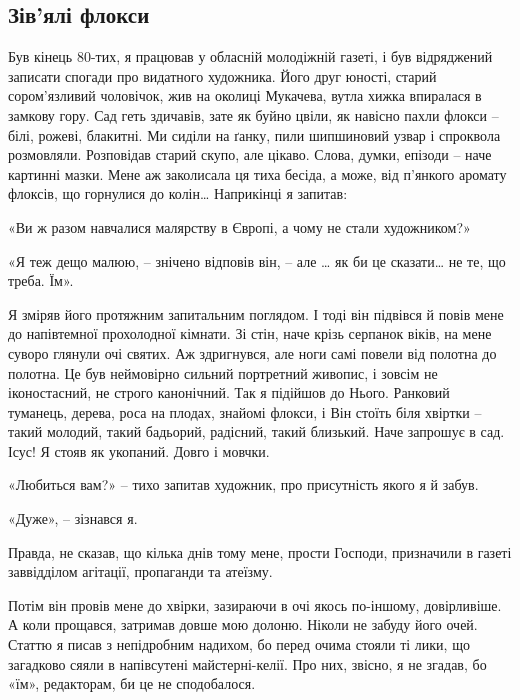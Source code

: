  
 
 

\subsection{Зів’ялі флокси}

Був кінець 80-тих, я працював у обласній молодіжній газеті, і був відряджений
записати спогади про видатного художника. Його друг юності, старий
сором’язливий чоловічок, жив на околиці Мукачева, вутла хижка впиралася в
замкову гору. Сад геть здичавів, зате як буйно цвіли, як навісно пахли флокси
– білі, рожеві, блакитні. Ми сиділи на ґанку, пили шипшиновий узвар і
спроквола розмовляли. Розповідав старий скупо, але цікаво. Слова, думки,
епізоди – наче картинні мазки. Мене аж заколисала ця тиха бесіда, а може, від
п’янкого аромату флоксів, що горнулися до колін… Наприкінці я запитав:

«Ви ж разом навчалися малярству в Європі, а чому не стали художником?»

«Я теж дещо малюю, – знічено відповів він, – але … як би це сказати… не те, що треба. Їм».

Я зміряв його протяжним запитальним поглядом. І тоді він підвівся й повів мене
до напівтемної прохолодної кімнати. Зі стін, наче крізь серпанок віків, на
мене суворо глянули очі святих. Аж здригнувся, але ноги самі повели від
полотна до полотна. Це був неймовірно сильний портретний живопис, і зовсім не
іконостасний, не строго канонічний. Так я підійшов до Нього. Ранковий
туманець, дерева, роса на плодах, знайомі флокси, і Він стоїть біля хвіртки –
такий молодий, такий бадьорий, радісний, такий близький. Наче запрошує в сад.
Ісус! Я стояв як укопаний. Довго і мовчки.

«Любиться вам?» – тихо запитав художник, про присутність якого я й забув.

«Дуже», – зізнався я.

Правда, не сказав, що кілька днів тому мене, прости Господи, призначили в
газеті заввідділом агітації, пропаганди та атеїзму.

Потім він провів мене до хвірки, зазираючи в очі якось по-іншому, довірливіше.
А коли прощався, затримав довше мою долоню. Ніколи не забуду його очей. Статтю
я писав з непідробним надихом, бо перед очима стояли ті лики, що загадково
сяяли в напівсутені майстерні-келії. Про них, звісно, я не згадав, бо «їм»,
редакторам, би це не сподобалося.

